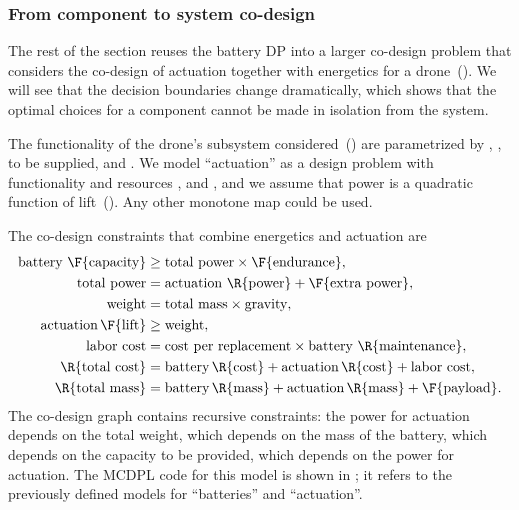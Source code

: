 \subsubsection*{From component to system co-design}

The rest of the section reuses the battery DP into a larger co-design
problem that considers the co-design of actuation together with energetics
for a drone~(). We will see that the decision
boundaries change dramatically, which shows that the optimal choices
for a component cannot be made in isolation from the system.

The functionality of the drone's subsystem considered~()
are parametrized by , ,  to be supplied, and . We model ``actuation''
as a design problem with functionality  and resources
,  and , and we assume that power is
a quadratic function of lift~(). Any other monotone
map could be used.


\noindent The co-design constraints that combine energetics and actuation
are{\small{}
\begin{align}
\text{battery }\F{\text{capacity}} & \geq\text{total power}\times\F{\text{endurance}},\label{eq:drone_eq_first}\\
\text{total power} & =\text{actuation }\R{\text{power}}+\F{\text{extra power}},\nonumber \\
\text{weight} & =\text{total mass}\times\text{gravity},\nonumber \\
\text{actuation}\,\F{\text{lift}} & \geq\text{weight},\nonumber \\
\text{labor cost} & =\text{cost per replacement}\times\text{battery }\R{\text{maintenance}},\nonumber \\
\R{\text{total cost}} & =\text{battery}\,\R{\text{cost}}+\text{actuation}\,\R{\text{cost}}+\text{labor cost},\nonumber \\
\R{\text{total mass}} & =\text{battery}\,\R{\text{mass}}+\text{actuation}\,\R{\text{mass}}+\F{\text{payload}}.\label{eq:drone_eq_last}
\end{align}
}The co-design graph contains recursive constraints: the power for
actuation depends on the total weight, which depends on the mass of
the battery, which depends on the capacity to be provided, which depends
on the power for actuation. The MCDPL code  for this model is shown
in ; it refers to the previously defined models
for ``batteries'' and ``actuation''.

